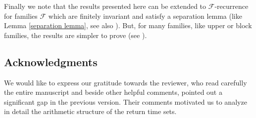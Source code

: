\documentclass[11pt]{amsart}
\begin{document}
Finally we note that the results presented here can be extended to $\mathcal F$-recurrence for families $\mathcal F$ which are finitely invariant and satisfy a separation lemma (like Lemma \ref{separation lemma}, see also \cite{MarMenPui22,BayGri04}). But, for many families, like upper or block families, the results are simpler to prove (see \cite{bonillazerofurstenberg_preprint}). 




\subsection*{Acknowledgments} We would like to express our gratitude towards the reviewer, who read carefully the entire manuscript and beside other helpful comments, pointed out a significant gap in the previous version. Their comments motivated us to analyze in detail the arithmetic structure of the return time sets.
\end{document}

